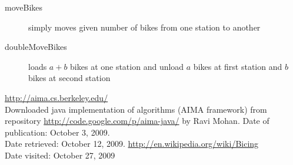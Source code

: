 \documentclass[a4paper,10pt]{report}
\begin{document}
\begin{description}
 \item[moveBikes] simply moves given number of bikes from one station to another
\item[doubleMoveBikes] loads \( a + b \) bikes at one station and unload \(a\) bikes at first station and \(b\) bikes at second station
 \end{description}


\clearpage
\begin{thebibliography}{9}
		\url{http://aima.cs.berkeley.edu/} \\
		{Downloaded java implementation of algorithms (AIMA framework) from repository \url{http://code.google.com/p/aima-java/} by Ravi Mohan. Date of publication: October 3, 2009. \\
		Date retrieved: October 12, 2009. }
\url{http://en.wikipedia.org/wiki/Bicing}\\
{Date visited: October 27, 2009}


\end{thebibliography}
\end{document}
